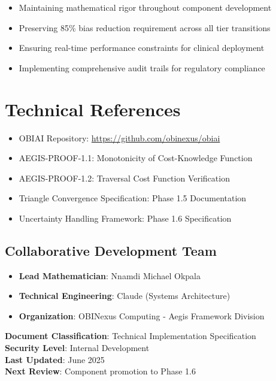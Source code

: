 \documentclass[11pt,letterpaper]{article}
\newcommand{\reporef}{\url{https://github.com/obinexus/obiai}}
\begin{document}
\begin{itemize}
    \item Maintaining mathematical rigor throughout component development
    \item Preserving 85\% bias reduction requirement across all tier transitions
    \item Ensuring real-time performance constraints for clinical deployment
    \item Implementing comprehensive audit trails for regulatory compliance
\end{itemize}

\section{Technical References}
\label{sec:references}

\begin{itemize}
    \item OBIAI Repository: \reporef
    \item AEGIS-PROOF-1.1: Monotonicity of Cost-Knowledge Function
    \item AEGIS-PROOF-1.2: Traversal Cost Function Verification
    \item Triangle Convergence Specification: Phase 1.5 Documentation
    \item Uncertainty Handling Framework: Phase 1.6 Specification
\end{itemize}

\subsection{Collaborative Development Team}

\begin{itemize}
    \item \textbf{Lead Mathematician}: Nnamdi Michael Okpala
    \item \textbf{Technical Engineering}: Claude (Systems Architecture)
    \item \textbf{Organization}: OBINexus Computing - Aegis Framework Division
\end{itemize}

\vfill
\noindent\textbf{Document Classification}: Technical Implementation Specification \\
\textbf{Security Level}: Internal Development \\
\textbf{Last Updated}: June 2025 \\
\textbf{Next Review}: Component promotion to Phase 1.6
\end{document}
